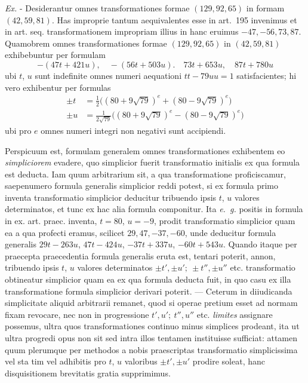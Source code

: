 \textit{Ex.} - Desiderantur omnes transformationes formae $(129,92,65)$ in formam $(42,59,81)$. Has improprie tantum aequivalentes esse in art.~195 invenimus et in art. seq. transformationem impropriam illius in hanc eruimus $-47,-56,73,87$. Quamobrem omnes transformationes formae $(129,92,65)$ in $(42,59,81)$ exhibebuntur per formulam
\[
-(47t+421u),\quad -(56t+503u).\quad 73t+653u,\quad 87t+780u
\]
ubi $t$, $u$ sunt indefinite omnes numeri aequationi $tt-79uu=1$ satisfacientes; hi vero exhibentur per formulas
\[
\begin{aligned}
\pm t&=\tfrac12\bigl((80+9\sqrt{79})^e+(80-9\sqrt{79})^e\bigr)\\
\pm u&=\tfrac{1}{2\sqrt{79}}\bigl((80+9\sqrt{79})^e-(80-9\sqrt{79})^e\bigr)
\end{aligned}
\]
ubi pro $e$ omnes numeri integri non negativi sunt accipiendi.

Perspicuum est, formulam generalem omnes transformationes exhibentem eo \textit{simpliciorem} evadere, quo simplicior fuerit transformatio initialis ex qua formula est deducta. Iam quum arbitrarium sit, a qua transformatione proficiscamur, saepenumero formula generalis simplicior reddi potest, si ex formula primo inventa transformatio simplicior deducitur tribuendo ipsis $t$, $u$ valores determinatos, et tunc ex hac alia formula componitur. Ita \textit{e.~g.} positis in formula in ex. art. praec. inventa, $t=80$, $u=-9$, prodit transformatio simplicior quam ea a qua profecti eramus, scilicet $29,47,-37,-60$, unde deducitur formula generalis $29t-263u$, $47t-424u$, $-37t+337u$, $-60t+543u$. Quando itaque per praecepta praecedentia formula generalis eruta est, tentari poterit, annon, tribuendo ipsis $t$, $u$ valores determinatos $\pm t',\pm u';\ \pm t'',\pm u''$ etc. transformatio obtineatur simplicior quam ea ex qua formula deducta fuit, in quo casu ex illa transformatione formula simplicior derivari poterit. --- Ceterum in diiudicanda simplicitate aliquid arbitrarii remanet, quod si operae pretium esset ad normam fixam revocare, nec non in progressione $t',u';\ t'',u''$ etc. \textit{limites} assignare possemus, ultra quos transformationes continuo minus simplices prodeant, ita ut ultra progredi opus non sit sed intra illos tentamen instituisse sufficiat: attamen quum plerumque per methodos a nobis praescriptas transformatio simplicissima vel sta%
%
tim vel adhibitis pro $t$, $u$ valoribus $\pm t',\pm u'$ prodire soleat, hanc disquisitionem brevitatis gratia supprimimus.

